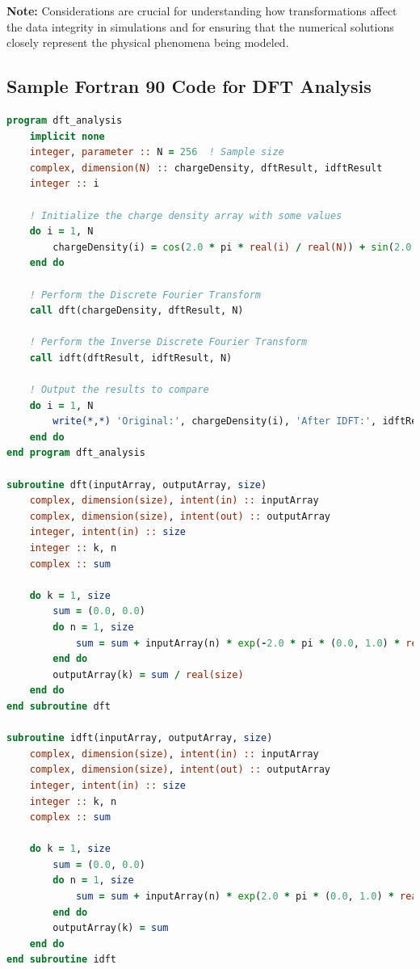 \documentclass{article}
\begin{document}
\textbf{Note:}
Considerations are crucial for understanding how transformations affect the data integrity in simulations and for ensuring that the numerical solutions closely represent the physical phenomena being modeled.

\subsection*{Sample Fortran 90 Code for DFT Analysis}
\begin{lstlisting}[language=fortran]
    program dft_analysis
    implicit none
    integer, parameter :: N = 256  ! Sample size
    complex, dimension(N) :: chargeDensity, dftResult, idftResult
    integer :: i

    ! Initialize the charge density array with some values
    do i = 1, N
        chargeDensity(i) = cos(2.0 * pi * real(i) / real(N)) + sin(2.0 * pi * real(i) / real(N)) * (0.0, 1.0)
    end do

    ! Perform the Discrete Fourier Transform
    call dft(chargeDensity, dftResult, N)

    ! Perform the Inverse Discrete Fourier Transform
    call idft(dftResult, idftResult, N)

    ! Output the results to compare
    do i = 1, N
        write(*,*) 'Original:', chargeDensity(i), 'After IDFT:', idftResult(i)
    end do
end program dft_analysis

subroutine dft(inputArray, outputArray, size)
    complex, dimension(size), intent(in) :: inputArray
    complex, dimension(size), intent(out) :: outputArray
    integer, intent(in) :: size
    integer :: k, n
    complex :: sum

    do k = 1, size
        sum = (0.0, 0.0)
        do n = 1, size
            sum = sum + inputArray(n) * exp(-2.0 * pi * (0.0, 1.0) * real(n - 1) * real(k - 1) / real(size))
        end do
        outputArray(k) = sum / real(size)
    end do
end subroutine dft

subroutine idft(inputArray, outputArray, size)
    complex, dimension(size), intent(in) :: inputArray
    complex, dimension(size), intent(out) :: outputArray
    integer, intent(in) :: size
    integer :: k, n
    complex :: sum

    do k = 1, size
        sum = (0.0, 0.0)
        do n = 1, size
            sum = sum + inputArray(n) * exp(2.0 * pi * (0.0, 1.0) * real(n - 1) * real(k - 1) / real(size))
        end do
        outputArray(k) = sum
    end do
end subroutine idft
\end{lstlisting}
\end{document}

